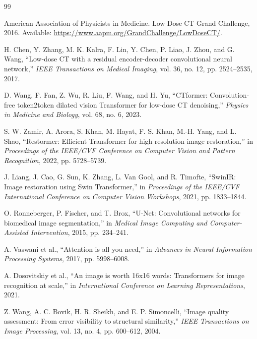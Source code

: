 \clearpage

\renewcommand{\bibname}{\xiaoyi\bf\vspace{5pt} References}

\begin{thebibliography}{99}
    \setlength{\itemindent}{-5pt}

     American Association of Physicists in Medicine. Low Dose CT Grand Challenge, 2016. Available: \url{https://www.aapm.org/GrandChallenge/LowDoseCT/}.

     H. Chen, Y. Zhang, M. K. Kalra, F. Lin, Y. Chen, P. Liao, J. Zhou, and G. Wang, ``Low-dose CT with a residual encoder-decoder convolutional neural network,'' \textit{IEEE Transactions on Medical Imaging}, vol. 36, no. 12, pp. 2524--2535, 2017.

     D. Wang, F. Fan, Z. Wu, R. Liu, F. Wang, and H. Yu, ``CTformer: Convolution-free token2token dilated vision Transformer for low-dose CT denoising,'' \textit{Physics in Medicine and Biology}, vol. 68, no. 6, 2023.

     S. W. Zamir, A. Arora, S. Khan, M. Hayat, F. S. Khan, M.-H. Yang, and L. Shao, ``Restormer: Efficient Transformer for high-resolution image restoration,'' in \textit{Proceedings of the IEEE/CVF Conference on Computer Vision and Pattern Recognition}, 2022, pp. 5728--5739.

     J. Liang, J. Cao, G. Sun, K. Zhang, L. Van Gool, and R. Timofte, ``SwinIR: Image restoration using Swin Transformer,'' in \textit{Proceedings of the IEEE/CVF International Conference on Computer Vision Workshops}, 2021, pp. 1833--1844.

     O. Ronneberger, P. Fischer, and T. Brox, ``U-Net: Convolutional networks for biomedical image segmentation,'' in \textit{Medical Image Computing and Computer-Assisted Intervention}, 2015, pp. 234--241.

     A. Vaswani et al., ``Attention is all you need,'' in \textit{Advances in Neural Information Processing Systems}, 2017, pp. 5998--6008.

     A. Dosovitskiy et al., ``An image is worth 16x16 words: Transformers for image recognition at scale,'' in \textit{International Conference on Learning Representations}, 2021.

     Z. Wang, A. C. Bovik, H. R. Sheikh, and E. P. Simoncelli, ``Image quality assessment: From error visibility to structural similarity,'' \textit{IEEE Transactions on Image Processing}, vol. 13, no. 4, pp. 600--612, 2004.


\end{thebibliography}
